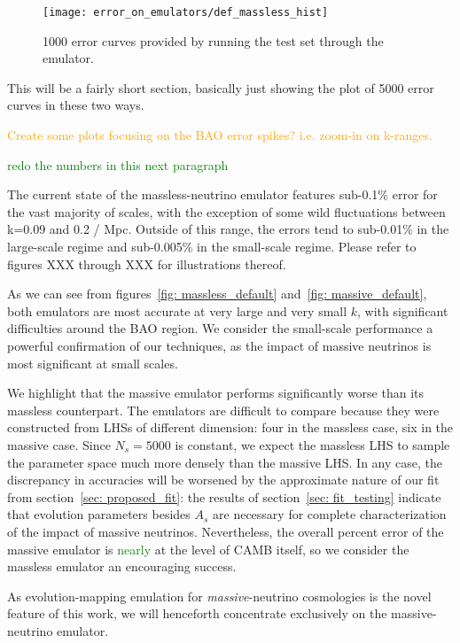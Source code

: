 \begin{figure}[ht!]
  \centering
  \texttt{[image: error\_on\_emulators/def\_massless\_hist]}
  \caption[Default Massless Emulator Error Histograms]{1000 error curves provided by running the test set through the emulator.}
  \label{fig: def_massless_hist}
\end{figure}

This will be a fairly short section, basically just showing the plot of 5000 
error curves in these two ways.


\textcolor{orange}{Create some plots focusing on the BAO error spikes? i.e.
zoom-in on k-ranges.}

\textcolor{green}{redo the numbers in this next paragraph}

The current state of the massless-neutrino emulator features sub-0.1\% error 
for the vast majority of scales, with the exception of some wild fluctuations  
between k=0.09 and 0.2 / Mpc. Outside of this range, the errors tend to 
sub-0.01\% in the large-scale regime and sub-0.005\% in the small-scale 
regime. Please refer to figures XXX through XXX for illustrations thereof.

As we can see from figures~\ref{fig: massless_default} 
and~\ref{fig: massive_default}, 
both emulators are most accurate at very large and
very small $k$, with significant difficulties around the BAO region. We
consider the small-scale performance a powerful confirmation of our
techniques, as the impact of massive neutrinos is most significant at small
scales.

We highlight that the massive emulator performs significantly worse than its 
massless counterpart. The emulators are difficult to compare because they
were constructed from LHSs of different dimension: four in the massless case,
six in the massive case. Since $N_s = 5000$ is constant, we expect the 
massless LHS to sample the parameter space much more densely than the massive
LHS. In any case, the discrepancy in accuracies will be worsened by the
approximate nature of our fit from section~\ref{sec: proposed_fit}:
the results of section~\ref{sec: fit_testing} indicate
that evolution parameters besides $A_s$ are necessary for complete
characterization of the impact of massive neutrinos. Nevertheless, the
overall percent error of the massive emulator is \textcolor{green}{nearly}
at the level of CAMB itself, so we consider the massless emulator an
encouraging success.

As evolution-mapping emulation for \textit{massive}-neutrino cosmologies
is the novel feature of this work, we will henceforth concentrate exclusively
on the massive-neutrino emulator.


